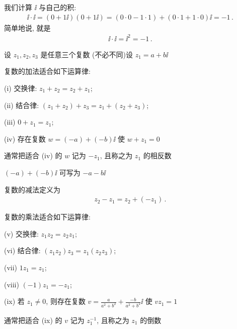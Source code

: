 \begin{example}
    我们计算 $\ii$ 与自己的积:
    \begin{align*}
        \ii \cdot \ii = (0 + 1\ii) (0 + 1\ii) = (0 \cdot 0 - 1 \cdot 1) + (0 \cdot 1 + 1 \cdot 0) \ii = -1 \period
    \end{align*}
    简单地说, 就是
    \begin{align*}
        \ii \cdot \ii = \ii^2 = -1 \period
    \end{align*}
\end{example}

设 $z_1, z_2, z_3$ 是任意三个复数 (不必不同)\period 设 $z_1 = a + b \ii$\period

\begin{proposition}
    复数的加法适合如下运算律:

    (i) 交换律: $z_1 + z_2 = z_2 + z_1$;

    (ii) 结合律: $(z_1 + z_2) + z_3 = z_1 + (z_2 + z_3)$;

    (iii) $0 + z_1 = z_1$;

    (iv) 存在复数 $w = (-a) + (-b) \ii$ 使 $w + z_1 = 0$\period

    通常把适合 (iv) 的 $w$ 记为 $-z_1$, 且称之为 $z_1$ 的相反数\period
\end{proposition}

\begin{remark}
    $(-a) + (-b) \ii$ 可写为 $-a-b \ii$\period
\end{remark}

\begin{definition}
    复数的减法定义为
    \begin{align*}
        z_2 - z_1 = z_2 + (-z_1) \period
    \end{align*}
\end{definition}

\begin{proposition}
    复数的乘法适合如下运算律:

    (v) 交换律: $z_1 z_2 = z_2 z_1$;

    (vi) 结合律: $(z_1 z_2) z_3 = z_1 (z_2 z_3)$;

    (vii) $1 z_1 = z_1$;

    (viii) $(-1) z_1 = -z_1$;

    (ix) 若 $z_1 \neq 0$, 则存在复数 $v = \frac{a}{a^2 + b^2} + \frac{-b}{a^2 + b^2} \ii$ 使 $v z_1 = 1$\period

    通常把适合 (ix) 的 $v$ 记为 $z_1^{-1}$, 且称之为 $z_1$ 的倒数\period
\end{proposition}

